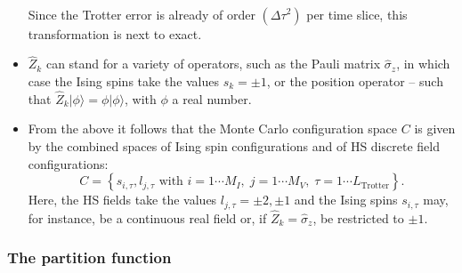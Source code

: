 \begin{itemize}
\begin{align}
\end{align}
Since the Trotter error is already of order $(\Delta \tau ^2) $ per time slice, this transformation is next to exact.
\item $\hat{Z}_k$ can stand for a variety of operators, such as the Pauli matrix $\hat{\sigma}_{z}$, in which case the Ising spins take the values $s_{k} = \pm 1$, or the position operator -- such that $ \hat{Z}_k | \phi\rangle = \phi|\phi\rangle $, with $\phi$ a real number.
\item From the above it follows that the  Monte Carlo configuration space $C$  
is given by the combined spaces of Ising spin configurations  and of HS discrete field configurations:
\begin{equation}
	C = \left\{   s_{i,\tau} ,  l_{j,\tau}  \text{ with }  i=1\cdots M_I,\;  j = 1\cdots M_V,\; \tau=1\cdots L_{\mathrm{Trotter}}  \right\}.
\end{equation}
Here, the HS fields take the values $l_{j,\tau} = \pm 2, \pm 1 $ and the Ising spins $s_{i,\tau}$ may, for instance, be a continuous real field or, if $\hat{Z}_k = \hat{\sigma}_{z}$, be restricted to $\pm 1$.
\end{itemize}

\subsubsection{The partition function}\label{sec:part}

